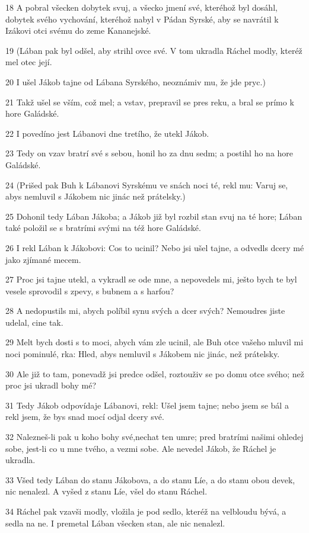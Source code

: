\par 18 A pobral všecken dobytek svuj, a všecko jmení své, kteréhož byl dosáhl, dobytek svého vychování, kteréhož nabyl v Pádan Syrské, aby se navrátil k Izákovi otci svému do zeme Kananejské.
\par 19 (Lában pak byl odšel, aby strihl ovce své. V tom ukradla Ráchel modly, kteréž mel otec její.
\par 20 I ušel Jákob tajne od Lábana Syrského, neoznámiv mu, že jde pryc.)
\par 21 Takž ušel se vším, což mel; a vstav, prepravil se pres reku, a bral se prímo k hore Galádské.
\par 22 I povedíno jest Lábanovi dne tretího, že utekl Jákob.
\par 23 Tedy on vzav bratrí své s sebou, honil ho za dnu sedm; a postihl ho na hore Galádské.
\par 24 (Prišed pak Buh k Lábanovi Syrskému ve snách noci té, rekl mu: Varuj se, abys nemluvil s Jákobem nic jinác než prátelsky.)
\par 25 Dohonil tedy Lában Jákoba; a Jákob již byl rozbil stan svuj na té hore; Lában také položil se s bratrími svými na též hore Galádské.
\par 26 I rekl Lában k Jákobovi: Cos to ucinil? Nebo jsi ušel tajne, a odvedls dcery mé jako zjímané mecem.
\par 27 Proc jsi tajne utekl, a vykradl se ode mne, a nepovedels mi, ješto bych te byl vesele sprovodil s zpevy, s bubnem a s harfou?
\par 28 A nedopustils mi, abych políbil synu svých a dcer svých? Nemoudres jiste udelal, cine tak.
\par 29 Melt bych dosti s to moci, abych vám zle ucinil, ale Buh otce vašeho mluvil mi noci pominulé, rka: Hled, abys nemluvil s Jákobem nic jinác, než prátelsky.
\par 30 Ale již to tam, ponevadž jsi predce odšel, roztouživ se po domu otce svého; než proc jsi ukradl bohy mé?
\par 31 Tedy Jákob odpovídaje Lábanovi, rekl: Ušel jsem tajne; nebo jsem se bál a rekl jsem, že bys snad mocí odjal dcery své.
\par 32 Nalezneš-li pak u koho bohy své,nechat ten umre; pred bratrími našimi ohledej sobe, jest-li co u mne tvého, a vezmi sobe. Ale nevedel Jákob, že Ráchel je ukradla.
\par 33 Všed tedy Lában do stanu Jákobova, a do stanu Líe, a do stanu obou devek, nic nenalezl. A vyšed z stanu Líe, všel do stanu Ráchel.
\par 34 Ráchel pak vzavši modly, vložila je pod sedlo, kteréž na velbloudu bývá, a sedla na ne. I premetal Lában všecken stan, ale nic nenalezl.
